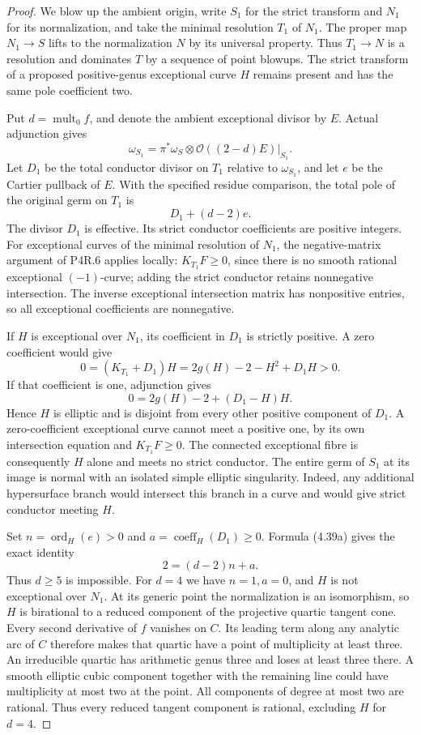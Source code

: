 \begin{proof}
We blow up the ambient origin, write $S_1$ for the strict
transform and $N_1$ for its normalization, and take the
minimal resolution $T_1$ of $N_1$. The proper map $N_1\to S$
lifts to the normalization $N$ by its universal property.
Thus $T_1\to N$ is a resolution and dominates $T$ by a
sequence of point blowups. The strict transform of a proposed
positive-genus exceptional curve $H$ remains present and has
the same pole coefficient two.

Put $d=\operatorname{mult}_0f$, and denote the ambient
exceptional divisor by $E$. Actual adjunction gives
\[
 \omega_{S_1}=\pi^*\omega_S\otimes
        \mathcal O((2-d)E)|_{S_1}.
\]
Let $D_1$ be the total conductor divisor on $T_1$ relative
to $\omega_{S_1}$, and let $e$ be the Cartier pullback of
$E$. With the specified residue comparison, the total pole
of the original germ on $T_1$ is
\[
                    D_1+(d-2)e.                       \tag{4.39a}
\]
The divisor $D_1$ is effective. Its strict conductor
coefficients are positive integers. For exceptional curves
of the minimal resolution of $N_1$, the negative-matrix
argument of P4R.6 applies locally: $K_{T_1}F\ge0$, since
there is no smooth rational exceptional $(-1)$-curve;
adding the strict conductor retains nonnegative intersection.
The inverse exceptional intersection matrix has nonpositive
entries, so all exceptional coefficients are nonnegative.

If $H$ is exceptional over $N_1$, its coefficient in $D_1$
is strictly positive. A zero coefficient would give
\[
 0=(K_{T_1}+D_1)H
   =2g(H)-2-H^2+D_1H>0.
\]
If that coefficient is one, adjunction gives
\[
 0=2g(H)-2+(D_1-H)H.
\]
Hence $H$ is elliptic and is disjoint from every other
positive component of $D_1$. A zero-coefficient exceptional
curve cannot meet a positive one, by its own intersection
equation and $K_{T_1}F\ge0$. The connected exceptional
fibre is consequently $H$ alone and meets no strict conductor.
The entire germ of $S_1$ at its image is normal with an
isolated simple elliptic singularity. Indeed, any additional
hypersurface branch would intersect this branch in a curve
and would give strict conductor meeting $H$.

Set $n=\operatorname{ord}_H(e)>0$ and
$a=\operatorname{coeff}_H(D_1)\ge0$. Formula (4.39a)
gives the exact identity
\[
                       2=(d-2)n+a.                    \tag{4.39b}
\]
Thus $d\ge5$ is impossible. For $d=4$ we have
$n=1,a=0$, and $H$ is not exceptional over $N_1$.
At its generic point the normalization is an isomorphism,
so $H$ is birational to a reduced component of the projective
quartic tangent cone. Every second derivative of $f$ vanishes
on $C$. Its leading term along any analytic arc of $C$
therefore makes that quartic have a point of multiplicity
at least three. An irreducible quartic has arithmetic genus
three and loses at least three there. A smooth elliptic cubic
component together with the remaining line could have
multiplicity at most two at the point. All components of
degree at most two are rational. Thus every reduced tangent
component is rational, excluding $H$ for $d=4$.


\end{proof}
